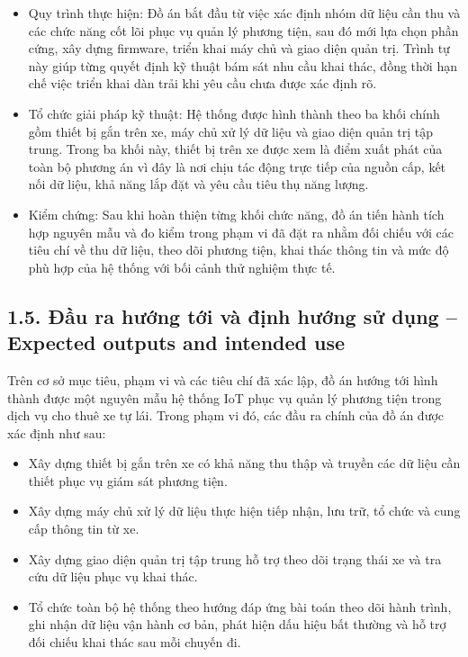 \documentclass[a4paper]{extarticle}
\providecommand{\tightlist}{%
  \setlength{\itemsep}{0pt}\setlength{\parskip}{0pt}}
\begin{document}
\begin{itemize}
\tightlist
\item
  Quy trình thực hiện: Đồ án bắt đầu từ việc xác định nhóm dữ liệu cần thu và các chức năng cốt lõi phục vụ quản lý phương tiện, sau đó mới lựa chọn phần cứng, xây dựng firmware, triển khai máy chủ và giao diện quản trị. Trình tự này giúp từng quyết định kỹ thuật bám sát nhu cầu khai thác, đồng thời hạn chế việc triển khai dàn trải khi yêu cầu chưa được xác định rõ.
\item
  Tổ chức giải pháp kỹ thuật: Hệ thống được hình thành theo ba khối chính gồm thiết bị gắn trên xe, máy chủ xử lý dữ liệu và giao diện quản trị tập trung. Trong ba khối này, thiết bị trên xe được xem là điểm xuất phát của toàn bộ phương án vì đây là nơi chịu tác động trực tiếp của nguồn cấp, kết nối dữ liệu, khả năng lắp đặt và yêu cầu tiêu thụ năng lượng.
\item
  Kiểm chứng: Sau khi hoàn thiện từng khối chức năng, đồ án tiến hành tích hợp nguyên mẫu và đo kiểm trong phạm vi đã đặt ra nhằm đối chiếu với các tiêu chí về thu dữ liệu, theo dõi phương tiện, khai thác thông tin và mức độ phù hợp của hệ thống với bối cảnh thử nghiệm thực tế.
\end{itemize}

\subsection{1.5. Đầu ra hướng tới và định hướng sử dụng -- Expected outputs and intended use}\label{ux111ux1ea7u-ra-hux1b0ux1edbng-tux1edbi-vuxe0-ux111ux1ecbnh-hux1b0ux1edbng-sux1eed-dux1ee5ng-expected-outputs-and-intended-use}

Trên cơ sở mục tiêu, phạm vi và các tiêu chí đã xác lập, đồ án hướng tới hình thành được một nguyên mẫu hệ thống IoT phục vụ quản lý phương tiện trong dịch vụ cho thuê xe tự lái. Trong phạm vi đó, các đầu ra chính của đồ án được xác định như sau:

\begin{itemize}
\tightlist
\item
  Xây dựng thiết bị gắn trên xe có khả năng thu thập và truyền các dữ liệu cần thiết phục vụ giám sát phương tiện.
\item
  Xây dựng máy chủ xử lý dữ liệu thực hiện tiếp nhận, lưu trữ, tổ chức và cung cấp thông tin từ xe.
\item
  Xây dựng giao diện quản trị tập trung hỗ trợ theo dõi trạng thái xe và tra cứu dữ liệu phục vụ khai thác.
\item
  Tổ chức toàn bộ hệ thống theo hướng đáp ứng bài toán theo dõi hành trình, ghi nhận dữ liệu vận hành cơ bản, phát hiện dấu hiệu bất thường và hỗ trợ đối chiếu khai thác sau mỗi chuyến đi.
\end{itemize}
\end{document}
